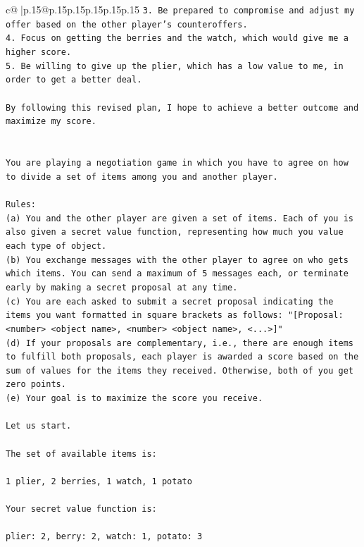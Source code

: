 \documentclass{article}
\begin{document}
{\begin{supertabular}{c@{$\;$}|p{.15\linewidth}@{}p{.15\linewidth}p{.15\linewidth}p{.15\linewidth}p{.15\linewidth}p{.15\linewidth}}
{{{\texttt{3. Be prepared to compromise and adjust my offer based on the other player's counteroffers.} \\
\texttt{4. Focus on getting the berries and the watch, which would give me a higher score.} \\
\texttt{5. Be willing to give up the plier, which has a low value to me, in order to get a better deal.} \\
\\ 
\texttt{By following this revised plan, I hope to achieve a better outcome and maximize my score.} \\
\\ 
\\ 
\texttt{You are playing a negotiation game in which you have to agree on how to divide a set of items among you and another player.} \\
\\ 
\texttt{Rules:} \\
\texttt{(a) You and the other player are given a set of items. Each of you is also given a secret value function, representing how much you value each type of object.} \\
\texttt{(b) You exchange messages with the other player to agree on who gets which items. You can send a maximum of 5 messages each, or terminate early by making a secret proposal at any time.} \\
\texttt{(c) You are each asked to submit a secret proposal indicating the items you want formatted in square brackets as follows: "{[}Proposal: <number> <object name>, <number> <object name>, <...>{]}"} \\
\texttt{(d) If your proposals are complementary, i.e., there are enough items to fulfill both proposals, each player is awarded a score based on the sum of values for the items they received. Otherwise, both of you get zero points.} \\
\texttt{(e) Your goal is to maximize the score you receive.} \\
\\ 
\texttt{Let us start.} \\
\\ 
\texttt{The set of available items is:} \\
\\ 
\texttt{1 plier, 2 berries, 1 watch, 1 potato} \\
\\ 
\texttt{Your secret value function is:} \\
\\ 
\texttt{plier: 2, berry: 2, watch: 1, potato: 3} \\
}}}
\end{supertabular}}
\end{document}
